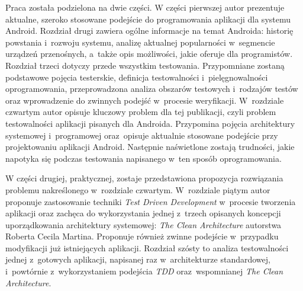 Praca została podzielona na dwie części. W części pierwszej autor prezentuje aktualne, szeroko stosowane podejście do programowania aplikacji dla systemu Android. Rozdział drugi zawiera ogólne informacje na temat Androida: historię powstania i~rozwoju systemu, analizę aktualnej popularności w~segmencie urządzeń przenośnych, a~także opis możliwości, jakie oferuje dla programistów. Rozdział trzeci dotyczy przede wszystkim testowania. Przypomniane zostaną podstawowe pojęcia testerskie, definicja testowalności i~pielęgnowalności oprogramowania, przeprowadzona analiza obszarów testowych i~rodzajów testów oraz wprowadzenie do zwinnych podejść w~procesie weryfikacji. W~rozdziale czwartym autor opisuje kluczowy problem dla tej publikacji, czyli problem testowalności aplikacji pisanych dla Androida. Przypomina pojęcia architektury systemowej i~programowej oraz~opisuje aktualnie stosowane podejście przy projektowaniu aplikacji Android. Następnie naświetlone zostają trudności, jakie napotyka się podczas testowania napisanego w~ten sposób oprogramowania.

W części drugiej, praktycznej, zostaje przedstawiona propozycja rozwiązania problemu nakreślonego w~rozdziale czwartym. W~rozdziale piątym autor proponuje zastosowanie techniki \textit{Test Driven Development} w~procesie tworzenia aplikacji oraz zachęca do wykorzystania jednej z~trzech opisanych koncepcji uporządkowania architektury systemowej: \textit{The Clean Architecture} autorstwa Roberta Cecila Martina. Proponuje również zwinne podejście w~przypadku modyfikacji już istniejących aplikacji. Rozdział szósty to analiza testowalności jednej z~gotowych aplikacji, napisanej raz w~architekturze standardowej, i~powtórnie z~wykorzystaniem podejścia \textit{TDD} oraz~wspomnianej \textit{The Clean Architecture}.

